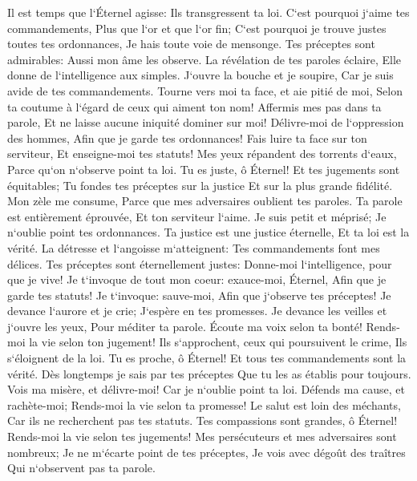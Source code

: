 \verse Il est temps que l`Éternel agisse: Ils transgressent ta loi. 
\verse C`est pourquoi j`aime tes commandements, Plus que l`or et que l`or fin; 
\verse C`est pourquoi je trouve justes toutes tes ordonnances, Je hais toute voie de mensonge. 
\verse Tes préceptes sont admirables: Aussi mon âme les observe. 
\verse La révélation de tes paroles éclaire, Elle donne de l`intelligence aux simples. 
\verse J`ouvre la bouche et je soupire, Car je suis avide de tes commandements. 
\verse Tourne vers moi ta face, et aie pitié de moi, Selon ta coutume à l`égard de ceux qui aiment ton nom! 
\verse Affermis mes pas dans ta parole, Et ne laisse aucune iniquité dominer sur moi! 
\verse Délivre-moi de l`oppression des hommes, Afin que je garde tes ordonnances! 
\verse Fais luire ta face sur ton serviteur, Et enseigne-moi tes statuts! 
\verse Mes yeux répandent des torrents d`eaux, Parce qu`on n`observe point ta loi. 
\verse Tu es juste, ô Éternel! Et tes jugements sont équitables; 
\verse Tu fondes tes préceptes sur la justice Et sur la plus grande fidélité. 
\verse Mon zèle me consume, Parce que mes adversaires oublient tes paroles. 
\verse Ta parole est entièrement éprouvée, Et ton serviteur l`aime. 
\verse Je suis petit et méprisé; Je n`oublie point tes ordonnances. 
\verse Ta justice est une justice éternelle, Et ta loi est la vérité. 
\verse La détresse et l`angoisse m`atteignent: Tes commandements font mes délices. 
\verse Tes préceptes sont éternellement justes: Donne-moi l`intelligence, pour que je vive! 
\verse Je t`invoque de tout mon coeur: exauce-moi, Éternel, Afin que je garde tes statuts! 
\verse Je t`invoque: sauve-moi, Afin que j`observe tes préceptes! 
\verse Je devance l`aurore et je crie; J`espère en tes promesses. 
\verse Je devance les veilles et j`ouvre les yeux, Pour méditer ta parole. 
\verse Écoute ma voix selon ta bonté! Rends-moi la vie selon ton jugement! 
\verse Ils s`approchent, ceux qui poursuivent le crime, Ils s`éloignent de la loi. 
\verse Tu es proche, ô Éternel! Et tous tes commandements sont la vérité. 
\verse Dès longtemps je sais par tes préceptes Que tu les as établis pour toujours. 
\verse Vois ma misère, et délivre-moi! Car je n`oublie point ta loi. 
\verse Défends ma cause, et rachète-moi; Rends-moi la vie selon ta promesse! 
\verse Le salut est loin des méchants, Car ils ne recherchent pas tes statuts. 
\verse Tes compassions sont grandes, ô Éternel! Rends-moi la vie selon tes jugements! 
\verse Mes persécuteurs et mes adversaires sont nombreux; Je ne m`écarte point de tes préceptes, 
\verse Je vois avec dégoût des traîtres Qui n`observent pas ta parole. 
